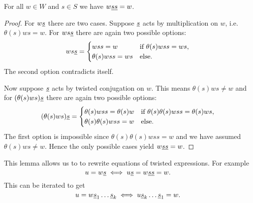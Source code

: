 \begin{lemm}
	For all $w \in W$ and $s \in S$ we have $w \underline{s} \underline{s} = w$.

	\begin{proof}
		For $w \underline{s}$ there are two cases. Suppose $\underline{s}$ acts by multiplication on $w$, i.e. $\theta(s)ws = w$. For $ws \underline{s}$ there are again two possible options:
		$$ ws \underline{s} = \begin{cases}
			wss = w & \textrm{if } \theta(s)wss = ws, \\
			\theta(s)wss = ws & \textrm{else}. \\
		\end{cases} $$
		The second option contradicts itself.

		Now suppose $\underline{s}$ acts by twisted conjugation on $w$. This means $\theta(s)ws \neq w$ and for $(\theta(s)ws) \underline{s}$ there are again two possible options:
		$$ (\theta(s)ws) \underline{s} = \begin{cases}
			\theta(s)wss = \theta(s)w & \textrm{if } \theta(s) \theta(s) w ss = \theta(s) w s, \\
			\theta(s)\theta(s)wss = w & \textrm{else}. \\
		\end{cases} $$
		The first option is impossible since $\theta(s) \theta(s) w ss = w$ and we have assumed $\theta(s)ws \neq w$. Hence the only possible cases yield $w \underline{s} \underline{s} = w$.
	\end{proof}
\end{lemm}

\begin{rema}
	This lemma allows us to to rewrite equations of twisted expressions. For example
	$$ u = w \underline{s} \iff u \underline{s} = w \underline{s} \underline{s} = w. $$
	This can be iterated to get
	$$ u = w \underline{s}_1 \ldots \underline{s}_k \iff u \underline{s}_k \ldots \underline{s}_1 = w. $$
\end{rema}

